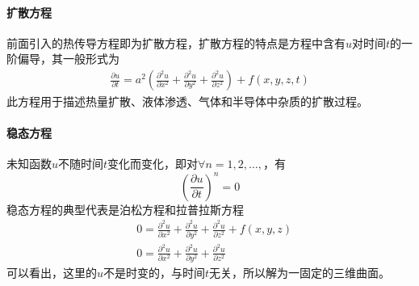     \paragraph{扩散方程}
    前面引入的热传导方程即为扩散方程，扩散方程的特点是方程中含有$u$对时间$t$的一阶偏导，其一般形式为
    \begin{align*}
        \frac{\partial u}{\partial t} = a^2 \left ( \frac{\partial^2 u}{\partial x^2} + \frac{\partial^2 u}{\partial y^2} + \frac{\partial^2 u}{\partial z^2} \right )+ f(x,y,z,t)
    \end{align*}
    此方程用于描述热量扩散、液体渗透、气体和半导体中杂质的扩散过程。
    \paragraph{稳态方程}
    未知函数$u$不随时间$t$变化而变化，即对$\forall n = 1,2,\dots, $，有
    \[
        \left ( \frac{\partial u}{\partial t}\right )^n = 0
    \]
    稳态方程的典型代表是泊松方程和拉普拉斯方程
    \begin{align*}
        & 0 = \frac{\partial^2 u}{\partial x^2} + \frac{\partial^2 u}{\partial y^2} + \frac{\partial^2 u}{\partial z^2} + f(x,y,z)\\
        & 0 = \frac{\partial^2 u}{\partial x^2} + \frac{\partial^2 u}{\partial y^2} + \frac{\partial^2 u}{\partial z^2}
    \end{align*}
    可以看出，这里的$u$不是时变的，与时间$t$无关，所以解为一固定的三维曲面。


